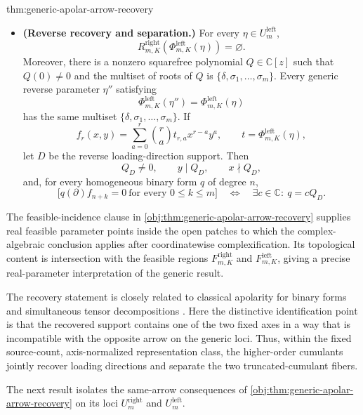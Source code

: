 \begin{theoremv}{thm:generic-apolar-arrow-recovery}
\begin{itemize}
\item \textbf{(Reverse recovery and separation.)} For every \(\eta\in U_m^{\mathrm{left}}\),
\[
R^{\mathrm{right}}_{m,K}\!\left(\Phi^{\mathrm{left}}_{m,K}(\eta)\right)=\varnothing.
\]
Moreover, there is a nonzero squarefree polynomial \(Q\in\mathbb C[z]\) such that
\(Q(0)\neq0\) and the multiset of roots of \(Q\) is
\(\{\delta,\sigma_1,\ldots,\sigma_m\}\). Every generic reverse parameter \(\eta''\) satisfying
\[
\Phi^{\mathrm{left}}_{m,K}(\eta'')=
\Phi^{\mathrm{left}}_{m,K}(\eta)
\]
has the same multiset \(\{\delta,\sigma_1,\ldots,\sigma_m\}\).  If
\[
f_r(x,y)=\sum_{a=0}^{r}\binom{r}{a}t_{r,a}x^{r-a}y^a,
\qquad
t=\Phi^{\mathrm{left}}_{m,K}(\eta),
\]
let \(D\) be the reverse loading-direction support. Then
\[
Q_D\neq0,\qquad y\mid Q_D,\qquad x\nmid Q_D,
\]
and, for every homogeneous binary form \(q\) of degree \(n\),
\[
\bigl[q(\partial)f_{n+k}=0\ \text{for every }0\leq k\leq m\bigr]
\quad\Longleftrightarrow\quad
\exists c\in\mathbb C:\ q=cQ_D.
\]
\end{itemize}
\end{theoremv}

The feasible-incidence clause in \cref{obj:thm:generic-apolar-arrow-recovery} supplies real feasible parameter points inside the open patches to which the complex-algebraic conclusion applies after coordinatewise complexification. Its topological content is intersection with the feasible regions \(F^{\mathrm{right}}_{m,K}\) and \(F^{\mathrm{left}}_{m,K}\), giving a precise real-parameter interpretation of the generic result.

The recovery statement is closely related to classical apolarity for binary forms and simultaneous tensor decompositions \citep{ComonMourrain1996,Landsberg2012,KoldaBader2009}. Here the distinctive identification point is that the recovered support contains one of the two fixed axes in a way that is incompatible with the opposite arrow on the generic loci. Thus, within the fixed source-count, axis-normalized representation class, the higher-order cumulants jointly recover loading directions and separate the two truncated-cumulant fibers.

The next result isolates the same-arrow consequences of \cref{obj:thm:generic-apolar-arrow-recovery} on its loci \(U_m^{\mathrm{right}}\) and \(U_m^{\mathrm{left}}\).

